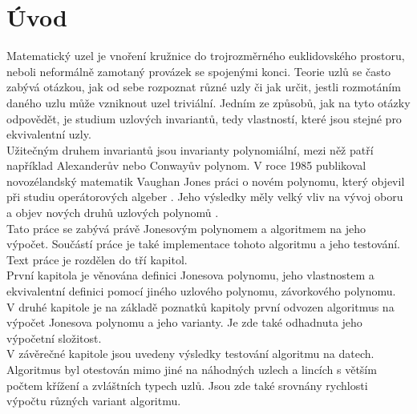 \chapter*{Úvod}

Matematický uzel je vnoření kružnice do trojrozměrného euklidovského prostoru, neboli neformálně zamotaný provázek se spojenými konci. Teorie uzlů se často zabývá otázkou, jak od sebe rozpoznat různé uzly či jak určit, jestli rozmotáním daného uzlu může vzniknout uzel triviální. Jedním ze způsobů, jak na tyto otázky odpovědět, je studium uzlových invariantů, tedy vlastností, které jsou stejné pro ekvivalentní uzly.
\\
Užitečným druhem invariantů jsou invarianty polynomiální, mezi něž patří například Alexanderův nebo	 Conwayův polynom. 
V roce 1985 publikoval novozélandský matematik Vaughan Jones práci o novém polynomu, který objevil při studiu operátorových algeber  \cite{jones1985}. 
Jeho výsledky měly velký vliv na vývoj oboru a objev nových druhů uzlových polynomů \cite{cromwell2004knots}.
\\
Tato práce se zabývá právě Jonesovým polynomem a algoritmem na jeho výpočet. Součástí práce je také implementace tohoto algoritmu a jeho testování.
\\

Text práce je rozdělen do tří kapitol. 
\\
První kapitola je věnována definici Jonesova polynomu, jeho vlastnostem a ekvivalentní definici pomocí jiného uzlového polynomu, závorkového polynomu.
\\
V druhé kapitole je na základě poznatků kapitoly první odvozen algoritmus na výpočet Jonesova polynomu a jeho varianty. Je zde také odhadnuta jeho výpočetní složitost.
\\
V závěrečné kapitole jsou uvedeny výsledky testování algoritmu na datech. Algoritmus byl otestován mimo jiné na náhodných uzlech a lincích s větším počtem křížení a zvláštních typech uzlů. Jsou zde také srovnány rychlosti výpočtu různých variant algoritmu.

